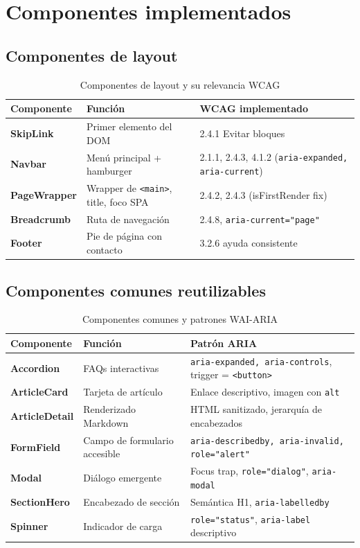 \documentclass[12pt, a4paper]{article}
\begin{document}
\section{Componentes implementados}

\subsection{Componentes de layout}

\begin{table}[H]
\centering
\caption{Componentes de layout y su relevancia WCAG}
\small
\begin{tabular}{@{}>{\bfseries}p{3cm} p{5cm} p{5.5cm}@{}}
\toprule
\rowcolor{royalblue!12}
\textbf{Componente} & \textbf{Función} & \textbf{WCAG implementado} \\
\midrule
SkipLink & Primer elemento del DOM & 2.4.1 Evitar bloques \\
Navbar & Menú principal + hamburger & 2.1.1, 2.4.3, 4.1.2 (\texttt{aria-expanded, aria-current}) \\
PageWrapper & Wrapper de \texttt{<main>}, title, foco SPA & 2.4.2, 2.4.3 (isFirstRender fix) \\
Breadcrumb & Ruta de navegación & 2.4.8, \texttt{aria-current="page"} \\
Footer & Pie de página con contacto & 3.2.6 ayuda consistente \\
\bottomrule
\end{tabular}
\end{table}

\subsection{Componentes comunes reutilizables}

\begin{table}[H]
\centering
\caption{Componentes comunes y patrones WAI-ARIA}
\small
\begin{tabular}{@{}>{\bfseries}p{3cm} p{5cm} p{5.5cm}@{}}
\toprule
\rowcolor{royalblue!12}
\textbf{Componente} & \textbf{Función} & \textbf{Patrón ARIA} \\
\midrule
Accordion & FAQs interactivas & \texttt{aria-expanded, aria-controls}, trigger = \texttt{<button>} \\
ArticleCard & Tarjeta de artículo & Enlace descriptivo, imagen con \texttt{alt} \\
ArticleDetail & Renderizado Markdown & HTML sanitizado, jerarquía de encabezados \\
FormField & Campo de formulario accesible & \texttt{aria-describedby, aria-invalid, role="alert"} \\
Modal & Diálogo emergente & Focus trap, \texttt{role="dialog"}, \texttt{aria-modal} \\
SectionHero & Encabezado de sección & Semántica H1, \texttt{aria-labelledby} \\
Spinner & Indicador de carga & \texttt{role="status"}, \texttt{aria-label} descriptivo \\
\bottomrule
\end{tabular}
\end{table}
\end{document}
